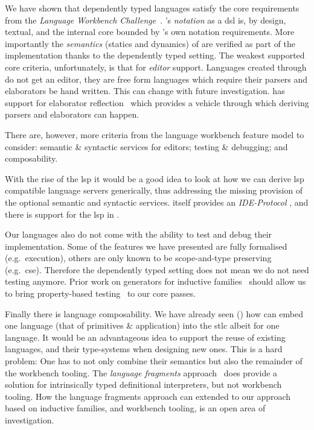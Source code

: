 We have shown that dependently typed languages satisfy the core requirements from the \emph{Language Workbench Challenge}~\cite{DBLP:conf/sle/ErdwegSVBBCGHKLKMPPSSSVVVWW13}.
%
\Velo{}'s \emph{notation} as a \ac{dsl} is, by design, textual, and the internal core bounded by \Idris{}'s own notation requirements.
%
More importantly the \emph{semantics} (statics and dynamics) of \Velo{}
are verified as part of the implementation thanks to the dependently typed setting.
%
The weakest supported core criteria, unfortunately, is that for \emph{editor} support.
%
Languages created through \Idris{} do not get an editor, they are free form languages which require their parsers and elaborators be hand written.
This can change with future investigation.
\Idris{} has support for elaborator reflection~\cite{DBLP:conf/icfp/ChristiansenB16} which provides a vehicle through which deriving parsers and elaborators can happen.


There are, however, more criteria from the language workbench feature model to consider:
%
semantic \& syntactic services for editors;
%
testing \& debugging;
%
and
%
composability.
%

With the rise of the \ac{lsp} it would be a good idea to look at how we can derive \ac{lsp} compatible language servers generically, thus addressing the missing provision of the optional semantic and syntactic services.
\Idris{} itself provides an \emph{IDE-Protocol}
, and there is support for the \ac{lsp} in \Idris{}.

Our languages also do not come with the ability to test and debug their
implementation.
%
Some of the features we have presented are fully formalised (e.g.\ execution),
others are only known to be scope-and-type preserving (e.g.\ \ac{cse}).
%
Therefore the dependently typed setting does not mean we do not need testing
anymore.
%
Prior work on generators for inductive families~\cite{DBLP:journals/pacmpl/LampropoulosPP18}
should allow us to bring property-based testing~\cite{DBLP:conf/icfp/ClaessenH00} to our core passes.


Finally there is language composability.
%
We have already seen () how \Velo{} can embed one language (that of primitives \& application) into the \ac{stlc} albeit for one language.
%
It would be an advantageous idea to support the reuse of existing languages, and their type-systems when designing new ones.
%
This is a hard problem:
%
One has to not only combine their semantics but also the remainder of the workbench tooling.
%
The \emph{language fragments} approach~\cite{10.1145/3563355} does provide a solution for intrinsically typed definitional interpreters, but not workbench tooling.
How the language fragments approach can extended to our approach based on inductive families, and workbench tooling, is an open area of investigation.


